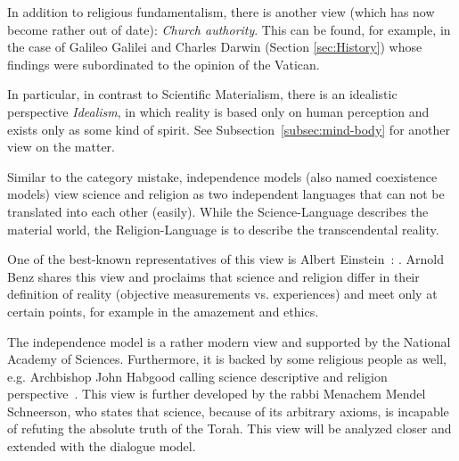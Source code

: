 In addition to religious fundamentalism, there is another view (which has now become rather out of date): \emph{Church authority}.
This can be found, for example, in the case of Galileo Galilei and Charles Darwin (Section \ref{sec:History}) whose findings were subordinated to the opinion of the Vatican.


In particular, in contrast to Scientific Materialism, there is an idealistic perspective \emph{Idealism}, in which reality is based only on human perception and exists only as some kind of spirit.
See Subsection~\ref{subsec:mind-body} for another view on the matter.





Similar to the category mistake, independence models (also named coexistence models) view science and religion as two independent languages that can not be translated into each other (easily).
While the Science-Language describes the  material world, the Religion-Language is to describe the transcendental reality.

One of the best-known representatives of this view is Albert Einstein~\cite[p.~605\,ff.]{einstein1940science}:
.
Arnold Benz shares this view and proclaims that science and religion
differ in their definition of reality (objective measurements vs. experiences) and meet only at certain points, for example in the amazement and ethics.

The independence model is a rather modern view and supported by the
National Academy of Sciences.
Furthermore, it is backed by some religious people as well, e.g. Archbishop John Habgood calling science descriptive and religion perspective~\cite{habgood1964religion}.
This view is further developed by the rabbi Menachem Mendel Schneerson, who states that science, because of its arbitrary axioms, is incapable of refuting the absolute truth of the Torah. This view will be analyzed closer and extended with the dialogue model.

